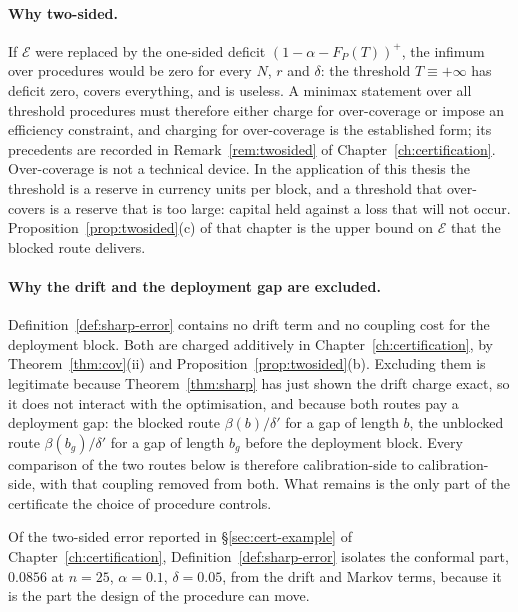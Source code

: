 \documentclass[../../../main.tex]{subfiles}
\begin{document}
\paragraph{Why two-sided.} If $\mathcal E$ were replaced by the one-sided deficit $(1-\alpha-F_P(T))^+$, the infimum over procedures would be zero for every $N$, $r$ and $\delta$: the threshold $T\equiv+\infty$ has deficit zero, covers everything, and is useless. A minimax statement over all threshold procedures must therefore either charge for over-coverage or impose an efficiency constraint, and charging for over-coverage is the established form; its precedents are recorded in Remark~\ref{rem:twosided} of Chapter~\ref{ch:certification}. Over-coverage is not a technical device. In the application of this thesis the threshold is a reserve in currency units per block, and a threshold that over-covers is a reserve that is too large: capital held against a loss that will not occur. Proposition~\ref{prop:twosided}(c) of that chapter is the upper bound on $\mathcal E$ that the blocked route delivers.

\paragraph{Why the drift and the deployment gap are excluded.} Definition~\ref{def:sharp-error} contains no drift term and no coupling cost for the deployment block. Both are charged additively in Chapter~\ref{ch:certification}, by Theorem~\ref{thm:cov}(ii) and Proposition~\ref{prop:twosided}(b). Excluding them is legitimate because Theorem~\ref{thm:sharp} has just shown the drift charge exact, so it does not interact with the optimisation, and because both routes pay a deployment gap: the blocked route $\beta(b)/\delta'$ for a gap of length $b$, the unblocked route $\beta(b_g)/\delta'$ for a gap of length $b_g$ before the deployment block. Every comparison of the two routes below is therefore calibration-side to calibration-side, with that coupling removed from both. What remains is the only part of the certificate the choice of procedure controls.

\begin{remark}\label{rem:sharp-func-numbers}
Of the two-sided error reported in \S\ref{sec:cert-example} of Chapter~\ref{ch:certification}, Definition~\ref{def:sharp-error} isolates the conformal part, $0.0856$ at $n=25$, $\alpha=0.1$, $\delta=0.05$, from the drift and Markov terms, because it is the part the design of the procedure can move.
\end{remark}
\end{document}

